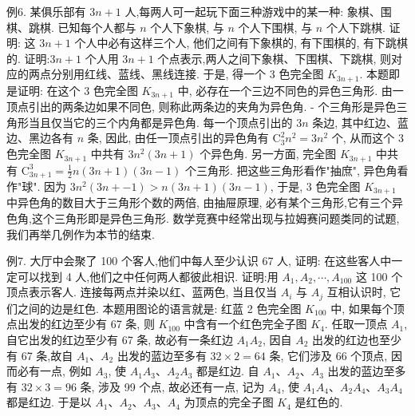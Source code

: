 例6. 某俱乐部有 $3 n+1$ 人,每两人可一起玩下面三种游戏中的某一种: 象棋、围棋、跳棋.
已知每个人都与 $n$ 个人下象棋, 与 $n$ 个人下围棋, 与 $n$ 个人下跳棋.
证明: 这 $3 n+1$ 个人中必有这样三个人, 他们之间有下象棋的, 有下围棋的, 有下跳棋的.
证明:$3 n+1$ 个人用 $3 n+1$ 个点表示,两人之间下象棋、下围棋、下跳棋, 则对应的两点分别用红线、蓝线、黑线连接.
于是, 得一个 3 色完全图 $K_{3 n+1}$. 本题即是证明: 在这个 3 色完全图 $K_{3 n+1}$ 中, 必存在一个三边不同色的异色三角形.
由一顶点引出的两条边如果不同色, 则称此两条边的夹角为异色角.
- 个三角形是异色三角形当且仅当它的三个内角都是异色角.
每一个顶点引出的 $3 n$ 条边, 其中红边、蓝边、黑边各有 $n$ 条, 因此, 由任一顶点引出的异色角有 $\mathrm{C}_3^2 n^2=3 n^2$ 个, 从而这个 3 色完全图 $K_{3 n+1}$ 中共有 $3 n^2(3 n+1)$ 个异色角.
另一方面, 完全图 $K_{3 n+1}$ 中共有 $\mathrm{C}_{3 n+1}^3=\frac{1}{2} n(3 n+1)(3 n-1)$ 个三角形.
把这些三角形看作"抽庶", 异色角看作"球". 因为 $3 n^2(3 n+-1)>n(3 n+1)(3 n-1)$, 于是, 3 色完全图 $K_{3 n+1}$ 中异色角的数目大于三角形个数的两倍, 由抽屉原理, 必有某个三角形,它有三个异色角,这个三角形即是异色三角形.
数学竞赛中经常出现与拉姆赛问题类同的试题, 我们再举几例作为本节的结束.



例7. 大厅中会聚了 100 个客人,他们中每人至少认识 67 人, 证明: 在这些客人中一定可以找到 4 人,他们之中任何两人都彼此相识.
证明:用 $A_1, A_2, \cdots, A_{100}$ 这 100 个顶点表示客人.
连接每两点并染以红、蓝两色, 当且仅当 $A_i$ 与 $A_j$ 互相认识时, 它们之间的边是红色.
本题用图论的语言就是: 红蓝 2 色完全图 $K_{100}$ 中, 如果每个顶点出发的红边至少有 67 条, 则 $K_{100}$ 中含有一个红色完全子图 $K_4$.
任取一顶点 $A_1$, 自它出发的红边至少有 67 条, 故必有一条红边 $A_1 A_2$, 因自 $A_2$ 出发的红边也至少有 67 条,故自 $A_1 、 A_2$ 出发的蓝边至多有 $32 \times 2=64$ 条, 它们涉及 66 个顶点, 因而必有一点, 例如 $A_3$, 使 $A_1 A_3 、 A_2 A_3$ 都是红边.
自 $A_1 、 A_2 、 A_3$ 出发的蓝边至多有 $32 \times 3=96$ 条, 涉及 99 个点, 故必还有一点, 记为 $A_4$, 使 $A_1 A_4 、 A_2 A_4 、 A_3 A_4$ 都是红边.
于是以 $A_1 、 A_2 、 A_3 、 A_4$ 为顶点的完全子图 $K_4$ 是红色的.



